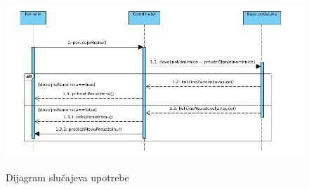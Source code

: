 \begin{figure}[ht]
    \leavevmode
    \begin{center}
    \includegraphics[width=125mm]{slike/DijagramSekvenci.png}\\
    \end{center}
    \caption{Dijagram slučajeva upotrebe}
\end{figure}


